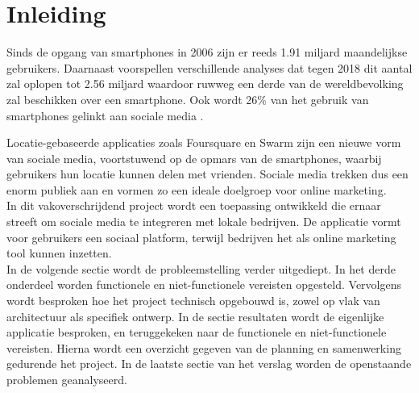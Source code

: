 \chapter{Inleiding}

Sinds de opgang van smartphones in 2006 zijn er reeds 1.91 miljard maandelijkse gebruikers. Daarnaast voorspellen verschillende analyses dat tegen 2018 dit aantal zal oplopen tot 2.56 miljard waardoor ruwweg een derde van de wereldbevolking zal beschikken over een smartphone.  Ook wordt 26\% van het gebruik van smartphones gelinkt aan sociale media \cite{smartphone_sales}. 

Locatie-gebaseerde applicaties zoals Foursquare\cite{foursquare} en Swarm\cite{swarm} zijn een nieuwe vorm van sociale media, voortstuwend op de opmars van de smartphones, waarbij gebruikers hun locatie kunnen delen met vrienden.
Sociale media trekken dus een enorm publiek aan en vormen zo een ideale doelgroep voor online marketing.\\

In dit vakoverschrijdend project wordt een toepassing ontwikkeld die ernaar streeft om sociale media te integreren met lokale bedrijven.
De applicatie vormt voor gebruikers een sociaal platform, terwijl bedrijven het als online marketing tool kunnen inzetten.\\

In de volgende sectie wordt de probleemstelling verder uitgediept. In het derde onderdeel worden functionele en niet-functionele vereisten opgesteld. Vervolgens wordt besproken hoe het project technisch opgebouwd is, zowel op vlak van architectuur als specifiek ontwerp. In de sectie resultaten wordt de eigenlijke applicatie besproken, en teruggekeken naar de functionele en niet-functionele vereisten. Hierna wordt een overzicht gegeven van de planning en samenwerking gedurende het project. In de laatste sectie van het verslag worden de openstaande problemen geanalyseerd.